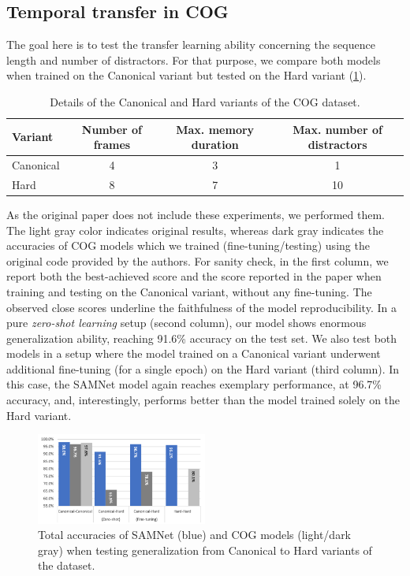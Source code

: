 \subsection{Temporal transfer in COG}
\label{sec:temporal}


The goal here is to test the transfer learning ability concerning the sequence length and number of distractors.
For that purpose, we compare both models when trained on the Canonical variant but tested on the 
Hard variant (\cref{fig:samnet_cog_overall_transfer}).

\begin{table}[ht]
	\centering
	\begin{adjustbox}{width=0.45\textwidth}
		\begin{tabular}{lccc}
			\toprule
			Variant	&	Number of frames	&	Max. memory duration	&	Max. number of distractors \\ 
			\midrule
			Canonical & 4 & 3 & 1\\	
			Hard  & 8 & 7 & 10\\
			\bottomrule	
		\end{tabular}
	\end{adjustbox}
	\caption{Details of the Canonical and Hard variants of the COG dataset.}
	\label{tab:cog_variants}
\end{table}\vspace{5pt}

As the original paper does not include these experiments, we performed them. The light gray color indicates original results, whereas dark gray indicates the accuracies of COG models which we trained (fine-tuning/testing) using the original code provided by the authors.
For sanity check, in the first column, we report both the best-achieved score and the score reported in the paper when training and testing on the Canonical variant, without any fine-tuning. The observed close scores underline the faithfulness of the model reproducibility.
In a pure \textit{zero-shot learning} setup (second column), our model shows enormous generalization ability, reaching 91.6\% accuracy on the test set.
We also test both models in a setup where the model trained on a Canonical variant underwent additional fine-tuning (for a single epoch) on the Hard variant (third column).
In this case, the SAMNet model again reaches exemplary performance, at 96.7\% accuracy, and, interestingly, performs better than the model trained solely on the Hard variant.

\begin{figure}[htb]
	\centering
	\includegraphics[width=0.5\textwidth]{img/results/samnet_cog_overall_transfer.png}
	\caption{Total accuracies of SAMNet (blue) and COG models (light/dark gray) when testing generalization from Canonical to Hard variants of the dataset.}
	\label{fig:samnet_cog_overall_transfer}
\end{figure}


